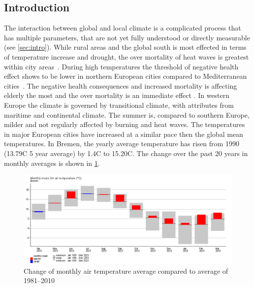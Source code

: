 \documentclass[12pt,a4paper, english,twoside]{article}
\begin{document}
    \subsection{Introduction}
      The interaction between global and local climate is a complicated process that has multiple parameters, that are not yet fully understood or directly measurable (see \cref{sec:intro}).  
      While rural areas and the global south is most effected in terms of temperature increase and drought, the over mortality of heat waves is greatest within city areas~\autocite{Gabriel2011}. During high temperatures the threshold of negative health effect shows to be lower in northern European cities compared to Mediterranean cities~\autocite{Baccini2008}. 
      The negative health consequences and increased mortality is affecting elderly the most and the over mortality is an immediate effect \autocite{Baccini2008}. 
      In western Europe the climate is governed by transitional climate, with attributes from maritime and continental climate.
      The summer is, compared to southern Europe, milder and not regularly affected by burning and heat waves. 
      The temperatures in major European cities have increased at a similar pace then the global mean temperatures. 
      In Bremen, the yearly average temperature has risen from 1990 (13.79\textdegree C  5 year average) by 1.4\textdegree C to 15.20\textdegree C.
      The change over the past 20 years in monthly averages is shown in \cref{fig:monthAvg}.
      \begin{figure}[!htbp]
          \centering
          \includegraphics[width=\textwidth]{img/BremenClimateAvgDiff2023.png}
          \caption{Change of monthly air temperature average compared to average of 1981--2010~\autocite{DWD2024a}\label{fig:monthAvg}}
      \end{figure}
\end{document}
